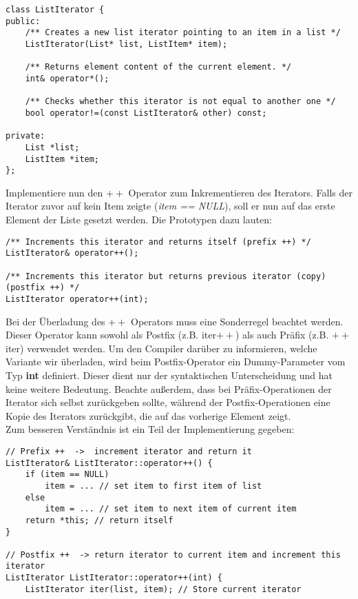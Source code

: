 \begin{enumerate}
\begin{lstlisting}
class ListIterator {
public:
	/** Creates a new list iterator pointing to an item in a list */
	ListIterator(List* list, ListItem* item);

	/** Returns element content of the current element. */
	int& operator*();

	/** Checks whether this iterator is not equal to another one */
	bool operator!=(const ListIterator& other) const;

private:
	List *list;
	ListItem *item;
};
\end{lstlisting} 


Implementiere nun den \textbf{$++$} Operator zum Inkrementieren des Iterators.
Falls der Iterator zuvor auf kein Item zeigte (\emph{item == NULL}), soll er nun auf das erste Element der Liste gesetzt werden.
Die Prototypen dazu lauten:
\begin{lstlisting}
/** Increments this iterator and returns itself (prefix ++) */
ListIterator& operator++();
	
/** Increments this iterator but returns previous iterator (copy) (postfix ++) */
ListIterator operator++(int);
\end{lstlisting} 

Bei der Überladung des \textbf{$++$} Operators muss eine Sonderregel beachtet werden.
Dieser Operator kann sowohl als Postfix (z.B. iter$++$) als auch Präfix (z.B. $++$iter) verwendet werden.
Um den Compiler darüber zu informieren, welche Variante wir überladen, wird beim Postfix-Operator ein Dummy-Parameter vom Typ \textbf{int} definiert.
Dieser dient nur der syntaktischen Unterscheidung und hat keine weitere Bedeutung.
Beachte außerdem, dass bei Präfix-Operationen der Iterator sich selbst zurückgeben sollte, während der Postfix-Operationen eine Kopie des Iterators zurückgibt, die auf das vorherige Element zeigt. \\

Zum besseren Verständnis ist ein Teil der Implementierung gegeben: 

\begin{lstlisting}
// Prefix ++  ->  increment iterator and return it
ListIterator& ListIterator::operator++() {
	if (item == NULL)
		item = ... // set item to first item of list
	else
		item = ... // set item to next item of current item
	return *this; // return itself
}

// Postfix ++  -> return iterator to current item and increment this iterator
ListIterator ListIterator::operator++(int) {
	ListIterator iter(list, item); // Store current iterator 
	

\end{lstlisting}
\end{enumerate}
